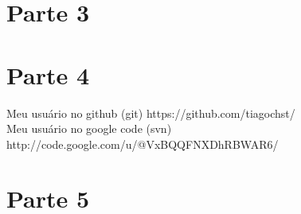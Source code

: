 \documentclass[11pt,a4paper]{article}
\begin{document}
\section{Parte 3}
\section{Parte 4}
Meu usuário no github (git) https://github.com/tiagochst/\\
Meu usuário no google code (svn) http://code.google.com/u/@VxBQQFNXDhRBWAR6/
\section{Parte 5}

% 
%   

 
\end{document}
